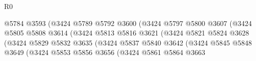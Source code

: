 \begin{lexlean}{R0}
\begin{coremodule}
                                              @5784
                                              @3593
                                              (@3424
                                                @5789
                                                @5792
                                                @3600
                                                (@3424
                                                  @5797
                                                  @5800
                                                  @3607
                                                  (@3424
                                                    @5805
                                                    @5808
                                                    @3614
                                                    (@3424
                                                      @5813
                                                      @5816
                                                      @3621
                                                      (@3424
                                                        @5821
                                                        @5824
                                                        @3628
                                                        (@3424
                                                          @5829
                                                          @5832
                                                          @3635
                                                          (@3424
                                                            @5837
                                                            @5840
                                                            @3642
                                                            (@3424
                                                              @5845
                                                              @5848
                                                              @3649
                                                              (@3424
                                                                @5853
                                                                @5856
                                                                @3656
                                                                (@3424
                                                                  @5861
                                                                  @5864
                                                                  @3663

\end{coremodule}
\end{lexlean}
